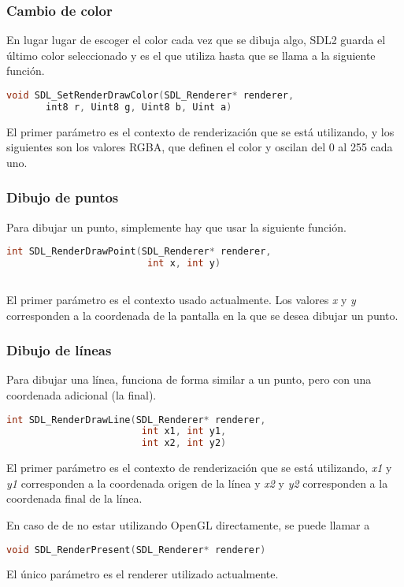 \subsubsection{Cambio de color}
En lugar lugar de escoger el color cada vez que se dibuja algo, SDL2 guarda el último color seleccionado y es el que utiliza hasta que se llama a la siguiente función.
\begin{lstlisting}[language=C]
  void SDL_SetRenderDrawColor(SDL_Renderer* renderer,
       int8 r, Uint8 g, Uint8 b, Uint a)
\end{lstlisting}
El primer parámetro es el contexto de renderización que se está utilizando, y los siguientes son los valores RGBA, que definen el color y oscilan del 0 al 255 cada uno.

\subsubsection{Dibujo de puntos}
Para dibujar un punto, simplemente hay que usar la siguiente función.
\begin{lstlisting}[language=C]
  int SDL_RenderDrawPoint(SDL_Renderer* renderer,
                         int x, int y)
  
\end{lstlisting}
El primer parámetro es el contexto usado actualmente. Los valores \textit{x} y \textit{y} corresponden a la coordenada de la pantalla en la que se desea dibujar un punto.

\subsubsection{Dibujo de líneas}
Para dibujar una línea, funciona de forma similar a un punto, pero con una coordenada adicional (la final).
\begin{lstlisting}[language=C]
  int SDL_RenderDrawLine(SDL_Renderer* renderer,
                        int x1, int y1,
                        int x2, int y2)
\end{lstlisting}
El primer parámetro es el contexto de renderización que se está utilizando, \textit{x1} y \textit{y1} corresponden a la coordenada origen de la línea y \textit{x2} y \textit{y2} corresponden a la coordenada final de la línea.


En caso de de no estar utilizando OpenGL directamente, se puede llamar a
\begin{lstlisting}[language=C]
  void SDL_RenderPresent(SDL_Renderer* renderer)
\end{lstlisting}
El único parámetro es el renderer utilizado actualmente.

